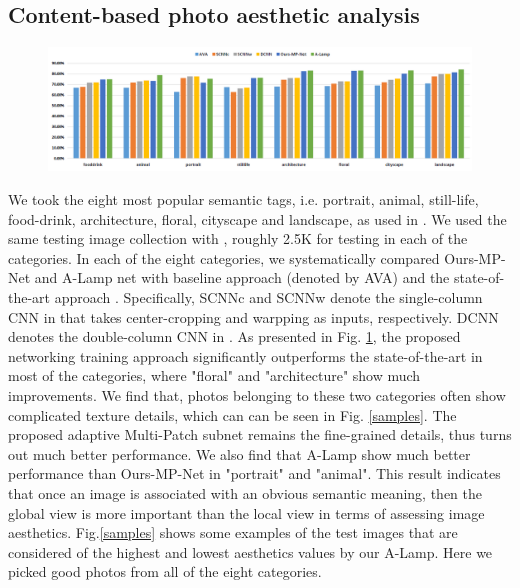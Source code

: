 \documentclass[10pt,twocolumn,letterpaper]{article}
\begin{document}
\subsection{Content-based photo aesthetic analysis} \label{content}

\begin{figure}
	\centering
	\includegraphics[scale=0.5]{figures/category.jpg}
	\label{category}
\end{figure}

We took the eight most popular semantic tags, i.e. portrait, animal, still-life, food-drink, architecture, floral, cityscape and landscape, as used in \cite{Murray:MMP2012:AVA}. We used the same testing image collection with \cite{Lu:2014:TMM:rating}, roughly 2.5K for testing in each of the categories.
In each of the eight categories, we systematically compared
Ours-MP-Net and A-Lamp net with baseline approach \cite{Murray:MMP2012:AVA} (denoted by AVA) and the state-of-the-art approach \cite{Lu:2014:TMM:rating}. Specifically, SCNN{\tiny c} and SCNN{\tiny w} denote the single-column CNN in \cite{Lu:2014:TMM:rating} that takes center-cropping and warpping as inputs, respectively. DCNN denotes the double-column CNN in \cite{Lu:2014:TMM:rating}.
As presented in Fig. \ref*{category}, the proposed networking training approach significantly outperforms the state-of-the-art in most of the categories, where "floral" and "architecture" show much improvements. We find that, photos belonging to these two categories often show complicated texture details, which can can be seen in Fig. \ref{samples}. The proposed adaptive Multi-Patch subnet remains the fine-grained details, thus turns out much better performance. We also find that A-Lamp show much better performance than Ours-MP-Net in "portrait" and "animal". This result indicates that once an image is associated with an obvious semantic meaning, then the global view is more important than the local view in terms of assessing image aesthetics. Fig.\ref{samples} shows some examples of the test images that are considered of the highest and lowest aesthetics values by our A-Lamp. Here we picked good photos from all of the eight categories.
\end{document}
